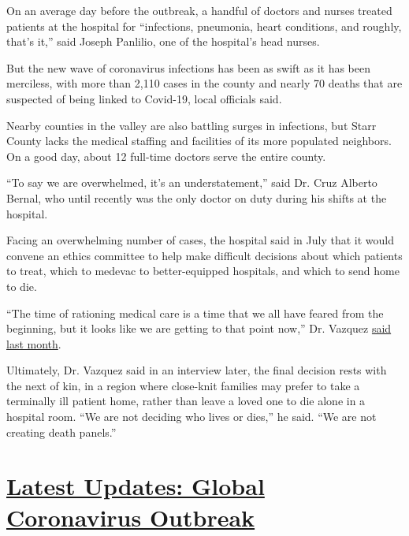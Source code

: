 On an average day before the outbreak, a handful of doctors and nurses
treated patients at the hospital for ``infections, pneumonia, heart
conditions, and roughly, that's it,'' said Joseph Panlilio, one of the
hospital's head nurses.

But the new wave of coronavirus infections has been as swift as it has
been merciless, with more than 2,110 cases in the county and nearly 70
deaths that are suspected of being linked to Covid-19, local officials
said.

Nearby counties in the valley are also battling surges in infections,
but Starr County lacks the medical staffing and facilities of its more
populated neighbors. On a good day, about 12 full-time doctors serve the
entire county.

``To say we are overwhelmed, it's an understatement,'' said Dr. Cruz
Alberto Bernal, who until recently was the only doctor on duty during
his shifts at the hospital.

Facing an overwhelming number of cases, the hospital said in July that
it would convene an ethics committee to help make difficult decisions
about which patients to treat, which to medevac to better-equipped
hospitals, and which to send home to die.

``The time of rationing medical care is a time that we all have feared
from the beginning, but it looks like we are getting to that point
now,'' Dr. Vazquez
\href{https://www.themonitor.com/2020/07/19/starr-county-form-ethics-committee-responsible-virus-resources/}{said
last month}.

Ultimately, Dr. Vazquez said in an interview later, the final decision
rests with the next of kin, in a region where close-knit families may
prefer to take a terminally ill patient home, rather than leave a loved
one to die alone in a hospital room. ``We are not deciding who lives or
dies,'' he said. ``We are not creating death panels.''

\hypertarget{latest-updates-global-coronavirus-outbreak}{%
\section{\texorpdfstring{\href{https://www.nytimes3xbfgragh.onion/2020/08/04/world/coronavirus-cases.html?action=click\&pgtype=Article\&state=default\&region=MAIN_CONTENT_1\&context=storylines_live_updates}{Latest
Updates: Global Coronavirus
Outbreak}}{Latest Updates: Global Coronavirus Outbreak}}\label{latest-updates-global-coronavirus-outbreak}}


